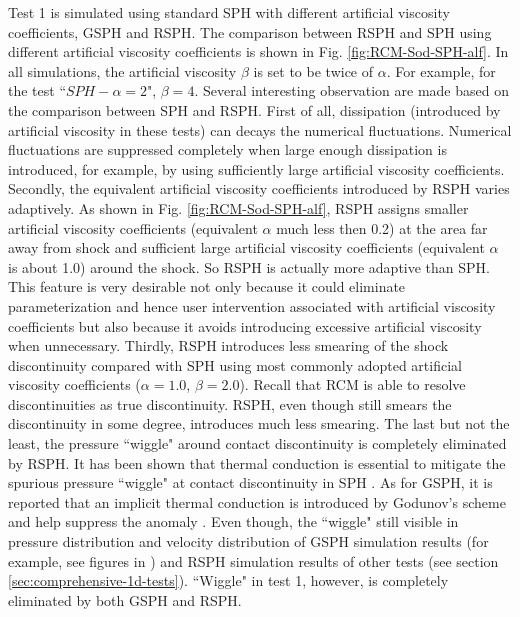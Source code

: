 Test 1 is simulated using standard SPH with different artificial viscosity coefficients, GSPH and RSPH. The comparison between RSPH and SPH using different artificial viscosity coefficients is shown in Fig. \ref{fig:RCM-Sod-SPH-alf}. In all simulations, the artificial viscosity $\beta$ is set to be twice of $\alpha$. For example, for the test ``$SPH-\alpha=2$", $\beta=4$. Several interesting observation are made based on the comparison between SPH and RSPH.
First of all, dissipation (introduced by artificial viscosity in these tests) can decays the numerical fluctuations. Numerical fluctuations are suppressed completely when large enough dissipation is introduced, for example, by using sufficiently large artificial viscosity coefficients.
Secondly, the equivalent artificial viscosity coefficients introduced by RSPH varies adaptively.
As shown in Fig. \ref{fig:RCM-Sod-SPH-alf}, RSPH assigns smaller artificial viscosity coefficients (equivalent $\alpha$ much less then 0.2) at the area far away from shock and sufficient large artificial viscosity coefficients (equivalent $\alpha$ is about 1.0) around the shock. So RSPH is actually more adaptive than SPH. This feature is very desirable not only because it could eliminate parameterization and hence user intervention associated with artificial viscosity coefficients but also because it avoids introducing excessive artificial viscosity when unnecessary.
Thirdly, RSPH introduces less smearing of the shock discontinuity compared with SPH using most commonly adopted artificial viscosity coefficients ($\alpha=1.0$, $\beta=2.0$). Recall that RCM is able to resolve discontinuities as true discontinuity. RSPH, even though still smears the discontinuity in some degree, introduces much less smearing.
The last but not the least, the pressure ``wiggle" around contact discontinuity is completely eliminated by RSPH. It has been shown that thermal conduction is essential to mitigate the spurious pressure ``wiggle" at contact discontinuity in SPH \citep{monaghan1997sph, sigalotti2006shock, price2008modelling, price2012smoothed}. As for GSPH, it is reported that an implicit thermal conduction is introduced by Godunov's scheme and help suppress the anomaly \citep{puri2014approximate}. Even though, the ``wiggle" still visible in pressure distribution and velocity distribution of GSPH simulation results (for example, see figures in \citep{puri2014comparison}) and RSPH simulation results of other tests (see section \ref{sec:comprehensive-1d-tests}). ``Wiggle" in test 1, however, is completely eliminated by both GSPH and RSPH.

